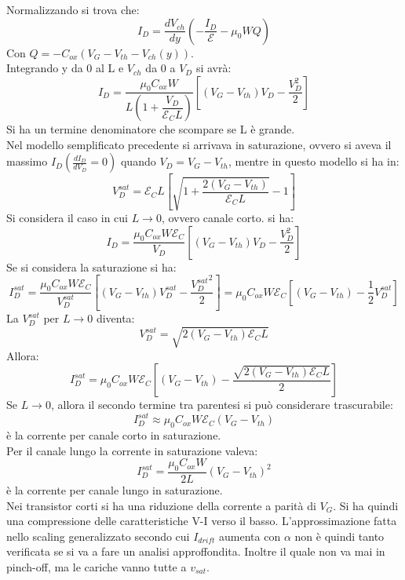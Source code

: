 Normalizzando si trova che:
\begin{equation}
    I_D=\dfrac{dV_{ch}}{dy}\left( -\dfrac{I_D}{\mathcal{E}}-\mu_0 WQ\right)
\end{equation}
Con $Q=-C_{ox}(V_G-V_{th}-V_{ch}(y))$.\\
Integrando y da 0 al L e $V_{ch}$ da 0 a $V_D$ si avrà:
\begin{equation}
    I_D=\dfrac{\mu_0 C_{ox} W}{L\left( 1+\dfrac{V_D}{\mathcal{E}_C L}\right)} \left[ (V_G-V_{th})V_D-\dfrac{V_D^2}{2}\right]
\end{equation}
Si ha un termine denominatore che scompare se L è grande.\\

Nel modello semplificato precedente si arrivava in saturazione, ovvero si aveva il massimo $I_D(\frac{dI_D}{dV_D}=0)$ quando $V_D=V_G-V_{th}$, mentre in questo modello si ha in:
\begin{equation}
    V_D^{sat}=\mathcal{E}_C L\left[\sqrt{1+\dfrac{2(V_G-V_{th})}{\mathcal{E}_C L}}-1\right]
\end{equation}
Si considera il caso in cui $L \rightarrow 0$, ovvero canale corto. si ha:
\begin{equation}
    I_D=\dfrac{\mu_0 C_{ox} W \mathcal{E}_C}{V_D} \left[ (V_G-V_{th})V_D-\dfrac{V_D^2}{2}\right]
\end{equation}
Se si considera la saturazione si ha:
\begin{equation}
    I_D^{sat}=\dfrac{\mu_0 C_{ox} W \mathcal{E}_C}{V_D^{sat}} \left[ (V_G-V_{th})V_D^{sat}-\dfrac{{V_D^{sat}}^2}{2}\right]=\mu_0 C_{ox} W \mathcal{E}_C\left[ (V_G-V_{th})-\dfrac{1}{2}V_D^{sat}\right]
\end{equation}
La $V_D^{sat}$ per $L \rightarrow 0$ diventa:
\begin{equation}
  V_D^{sat}=\sqrt{2(V_G-V_{th})\mathcal{E}_C L}
\end{equation}
Allora:
\begin{equation}
    I_D^{sat}=\mu_0 C_{ox} W \mathcal{E}_C \left[ (V_G-V_{th})-\dfrac{\sqrt{2(V_G-V_{th})\mathcal{E}_C L}}{2}\right]
\end{equation}
Se $L \rightarrow 0$, allora il secondo termine tra parentesi si può considerare trascurabile:
\begin{equation}
    I_D^{sat} \approx \mu_0 C_{ox} W \mathcal{E}_C (V_G-V_{th})
\end{equation}
è la corrente per canale corto in saturazione.\\
Per il canale lungo la corrente in saturazione valeva:
\begin{equation}
    I_D^{sat} = \dfrac{\mu_0 C_{ox} W }{2L} (V_G-V_{th})^2
\end{equation}
è la corrente per canale lungo in saturazione.\\
Nei transistor corti si ha una riduzione della corrente a parità di $V_G$. Si ha quindi una compressione delle caratteristiche V-I verso il basso. L'approssimazione fatta nello scaling generalizzato secondo cui $I_{drift}$ aumenta con $\alpha$ non è quindi tanto verificata se si va a fare un analisi approffondita. Inoltre il quale non va mai in pinch-off, ma le cariche vanno  tutte a $v_{sat}$.
%
\cleardoublepage
%
